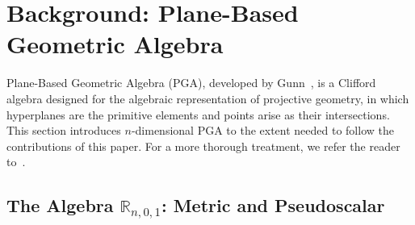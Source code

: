 \documentclass{birkjour}
\theoremstyle{definition}
\theoremstyle{remark}
\begin{document}
\section{Background: Plane-Based Geometric Algebra}
\label{sec:background}

Plane-Based Geometric Algebra (PGA), 
developed by Gunn~\cite{gunn2011geometrykinematicsrigidbody,
gunn2011homogeneousmodeleuclideangeometry}, is a Clifford algebra designed
for the algebraic representation of projective geometry, in which hyperplanes are the primitive elements and points arise as their intersections. This section introduces $n$-dimensional PGA to the extent needed to follow the contributions of this paper. For a more thorough treatment, we refer the reader to~\cite{dorst2022guidedPGA,
dorstmaytheforquebewithyou,leger2025tutorial}.

\subsection{The Algebra \texorpdfstring{$\mathbb{R}_{n,0,1}$}{G(n,0,1)}: Metric and Pseudoscalar}
\label{sec:algebra}
\end{document}
